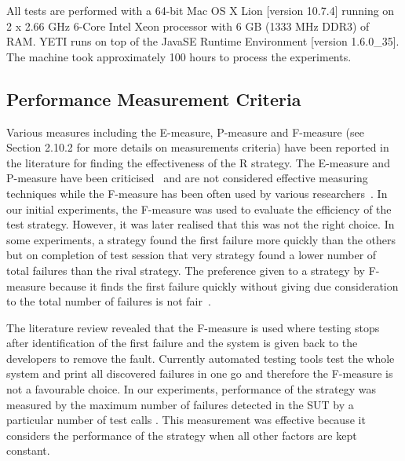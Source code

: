 All tests are performed with a 64-bit Mac OS X Lion [version 10.7.4] running on 2 x 2.66 GHz 6-Core Intel Xeon processor with 6 GB (1333 MHz DDR3) of RAM. YETI runs on top of the Java\texttrademark  SE Runtime Environment [version 1.6.0\_35]. The machine took approximately 100 hours to process the experiments.


\subsection{Performance Measurement Criteria} \label{measurementCriteria_4}
Various measures including the E-measure, P-measure and F-measure (see Section 2.10.2 for more details on measurements criteria) have been reported in the literature for finding the effectiveness of the R strategy. The E-measure and P-measure have been criticised~\cite{chen2005adaptive} and are not considered effective measuring techniques while the F-measure has been often used by various researchers~\cite{chen2004statistical, chen1996expected}. In our initial experiments, the F-measure was used to evaluate the efficiency of the test strategy. However, it was later realised that this was not the right choice. In some experiments, a strategy found the first failure more quickly than the others but on completion of test session that very strategy found a lower number of total failures than the rival strategy. The preference given to a strategy by F-measure because it finds the first failure quickly without giving due consideration to the total number of failures is not fair~\cite{liu2012comparison}.


  
The literature review revealed that the F-measure is used where testing stops after identification of the first failure and the system is given back to the developers to remove the fault. Currently automated testing tools test the whole system and print all discovered failures in one go and therefore the F-measure is not a favourable choice. In our experiments, performance of the strategy was measured by the maximum number of failures detected in the SUT by a particular number of test calls \cite{ciupa2007experimental, pacheco2007feedback, ciupa2008predictability}. This measurement was effective because it considers the performance of the strategy when all other factors are kept constant.



